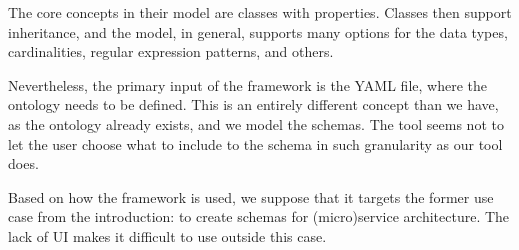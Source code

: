 

The core concepts in their model are classes with properties. Classes then support inheritance, and the model, in general, supports many options for the data types, cardinalities, regular expression patterns, and others.

Nevertheless, the primary input of the framework is the YAML file, where the ontology needs to be defined. This is an entirely different concept than we have, as the ontology already exists, and we model the schemas. The tool seems not to let the user choose what to include to the schema in such granularity as our tool does.

Based on how the framework is used, we suppose that it targets the former use case from the introduction: to create schemas for (micro)service architecture. The lack of UI makes it difficult to use outside this case.

